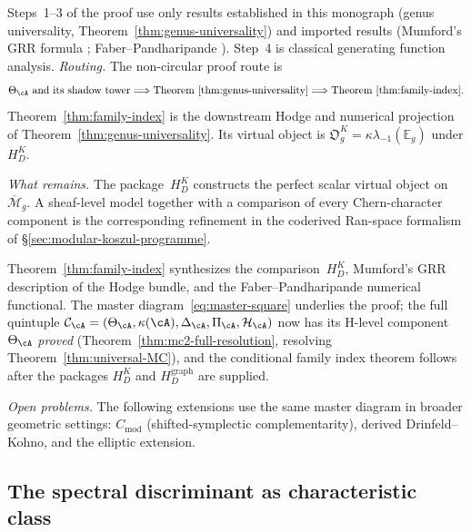 \begin{remark}[Scope]\label{rem:family-index-scope}
Steps~1--3 of the proof use only results established
in this monograph (genus universality,
Theorem~\ref{thm:genus-universality}) and imported results
(Mumford's GRR formula \cite{Mumford83}; Faber--Pandharipande
\cite{FP03}). Step~4 is classical generating function analysis.
\emph{Routing.} The non-circular proof route is
\[
\Theta_\cA \text{ and its shadow tower}
\Longrightarrow
\text{Theorem~\ref{thm:genus-universality}}
\Longrightarrow
\text{Theorem~\ref{thm:family-index}}.
\]
Theorem~\ref{thm:family-index} is the downstream Hodge and numerical
projection of Theorem~\ref{thm:genus-universality}.  Its virtual
object is $\mathfrak O_g^K=\kappa\lambda_{-1}(\mathbb E_g)$ under
$H_D^K$.

\emph{What remains.}
The package~$H_D^K$ constructs the perfect scalar virtual object on
$\overline{\mathcal M}_g$.  A sheaf-level model together with a
comparison of every Chern-character component is the corresponding
refinement in the coderived Ran-space formalism of
\S\ref{sec:modular-koszul-programme}.
\end{remark}

\begin{remark}
\label{rem:grr-horizon}
Theorem~\ref{thm:family-index} synthesizes the comparison~$H_D^K$,
Mumford's GRR description of the Hodge bundle, and the
Faber--Pandharipande numerical functional.
The master diagram~\eqref{eq:master-square} underlies the proof;
the full quintuple
$\mathcal{C}_{\cA} = (\Theta_{\cA}, \kappa(\cA), \Delta_{\cA},
\Pi_{\cA}, \mathcal{H}_{\cA})$ now has its H-level component
$\Theta_{\cA}$ \emph{proved}
\textup{(}Theorem~\textup{\ref{thm:mc2-full-resolution}},
resolving
Theorem~\textup{\ref{thm:universal-MC}}\textup{)},
and the conditional family index theorem follows after the packages
$H_D^K$ and $H_D^{\mathrm{graph}}$ are supplied.

\smallskip\noindent\emph{Open problems.}
The following extensions use the same master diagram in broader
geometric settings:
$C_{\mathrm{mod}}$ (shifted-symplectic complementarity),
derived Drinfeld--Kohno, and the elliptic extension.
\end{remark}

\subsection{The spectral discriminant as characteristic class}

